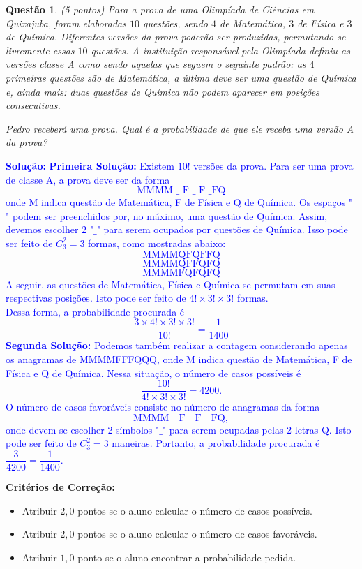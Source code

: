 \documentclass[oneside,a4paper,12pt]{article}
\newcommand{\under}{\texttt{\char`_}}
\theoremstyle{Colorido}
\theoremstyle{solu}
\theoremstyle{dotlessP}
\newcommand{\solucao}[1]{\textcolor{blue}{\textbf{Solução:} #1}}
\newtheorem{sol}{Questão}
\begin{document}
\newpage
	\begin{sol}
\textit{(5 pontos)} \newline \newline
Para a prova de uma Olimpíada de Ciências em Quixajuba, foram elaboradas $10$ questões, sendo $4$ de Matemática, $3$ de Física e $3$ de Química. Diferentes versões da prova poderão ser produzidas, permutando-se livremente essas $10$ questões. A instituição responsável pela Olimpíada definiu as versões classe A como sendo aquelas que seguem o seguinte padrão: as $4$ primeiras questões são de Matemática, a última deve ser uma questão de Química e, ainda mais: duas questões de Química não podem aparecer em posições consecutivas.

Pedro receberá uma prova. Qual é a probabilidade de que ele receba uma versão A da prova?
\end{sol}
\solucao{\textbf{Primeira Solução:}  Existem $10!$ versões da prova. Para ser uma prova de classe A, a prova deve ser da forma\[ \mbox{MMMM } \under \mbox{ F } \under \mbox{ F } \under \mbox{FQ}\]onde M indica questão de Matemática, F de Física e Q de Química. Os espaços "$\under$" podem ser preenchidos por, no máximo, uma questão de Química. Assim, devemos escolher $2$ "$\under$" para serem ocupados por questões de Química. Isso pode ser feito de $C_3^2=3$ formas, como mostradas abaixo: \[\mbox{MMMMQFQFFQ}\]\[\mbox{MMMMQFFQFQ}\]\[\mbox{MMMMFQFQFQ}\]
A seguir, as questões de Matemática, Física e Química se permutam em suas respectivas posições. Isto pode ser feito de $4!\times3!\times3!$ formas. \\ Dessa forma, a probabilidade procurada é \[ \frac{3\times4!\times3!\times3!}{10!}=\dfrac{1}{1400}\]\textbf{Segunda Solução:} Podemos também realizar a contagem considerando apenas os anagramas de MMMMFFFQQQ, onde M indica questão de Matemática, F de Física e Q de Química. Nessa situação, o número de casos possíveis é \[ \dfrac{10!}{4!\times3!\times3!}=4200.\] O número de casos favoráveis consiste no número de anagramas da forma\[ \mbox{MMMM } \under \mbox{ F } \under \mbox{ F } \under \mbox{ FQ}, \]onde devem-se escolher $2$ símbolos "$\under$" para serem ocupadas pelas $2$ letras Q. Isto pode ser feito de $C_3^2=3$ maneiras. Portanto, a probabilidade procurada é $\dfrac{3}{4200}=\dfrac{1}{1400}$.}
\begin{mdframed}
\textbf{Critérios de Correção:} \\
\begin{itemize}
    \item Atribuir $2,0$ pontos se o aluno calcular o número de casos possíveis.
    \item Atribuir $2,0$ pontos se o aluno calcular o número de casos favoráveis.
    \item Atribuir $1,0$ ponto se o aluno encontrar a probabilidade pedida.
\end{itemize}
\end{mdframed}
		
\end{document}
